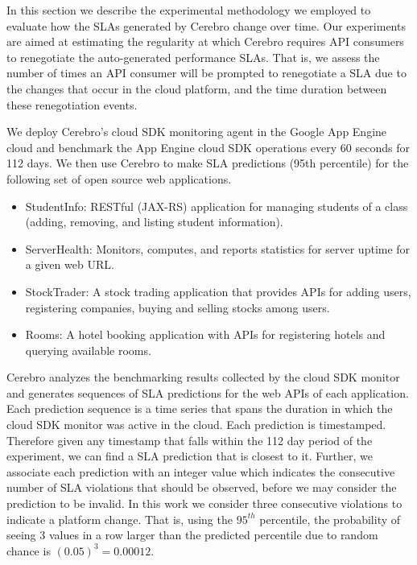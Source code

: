 In this section we describe the experimental methodology we employed to evaluate how the SLAs
generated by Cerebro change over time. Our experiments are aimed at estimating the regularity at
which Cerebro requires API consumers to renegotiate the auto-generated performance SLAs. That is,
we assess the number of times an API consumer will be prompted to renegotiate a
SLA due to the changes that occur in the cloud platform, and the time duration
between these renegotiation events.

We deploy Cerebro's cloud SDK monitoring agent in the Google App Engine cloud and benchmark
the App Engine cloud SDK operations every 60 seconds for 112 days. We then use Cerebro
to make SLA predictions (95th percentile) for the following set of open source web applications. 

\begin{itemize}
\vspace{-0.05in}
\item StudentInfo: RESTful (JAX-RS) application for managing
students of a class (adding, removing, and listing student information).
\vspace{-0.05in}
\item ServerHealth: Monitors, computes, and reports statistics for server
uptime for a given web URL.
\vspace{-0.05in}
\item StockTrader: A stock trading application that
provides APIs for adding users, registering companies, buying and selling
stocks among users. 
\vspace{-0.05in}
\item Rooms: A hotel booking application with APIs
for registering hotels and querying available rooms.
\vspace{-0.05in}
\end{itemize}

Cerebro analyzes the benchmarking results collected
by the cloud SDK monitor and generates sequences of SLA predictions for the web APIs of each
application. Each prediction sequence
is a time series that spans the duration in which the cloud SDK monitor was active
in the cloud. Each prediction is timestamped. Therefore given any timestamp that falls within the
112 day period of the experiment, we can find a SLA prediction that is closest to it. 
Further, we associate each prediction with an integer value which indicates the consecutive 
number of SLA violations that should be
observed, before we may consider the prediction to be invalid. In this work we consider three
consecutive violations to indicate a platform change. That is,
using the $95^{th}$ percentile, the probability of seeing $3$
values in a row larger than the predicted percentile due to random chance
is $(0.05)^3 = 0.00012$.

